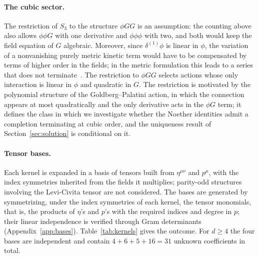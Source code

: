 \documentclass[prd,aps,preprint,nofootinbib,amsmath,amssymb,eqsecnum]{revtex4-2}
\begin{document}
\paragraph{The cubic sector.} The restriction of $S_3$ to the structure $\phi GG$ is an
assumption: the counting above also allows $\phi\phi G$ with one derivative and
$\phi\phi\phi$ with two, and both would keep the field equation of $G$ algebraic. Moreover, since $\delta^{(1)}\phi$ is linear in $\phi$, the variation of a nonvanishing purely
metric kinetic term would have to be compensated by terms of higher order in the fields; in the
metric formulation this leads to a series that does not terminate~\cite{BrandtFrenkel1996}.
The restriction to $\phi GG$ selects actions whose only interaction is linear in $\phi$ and
quadratic in $G$. The
restriction is motivated by the polynomial structure of the Goldberg--Palatini action, in
which the connection appears at most quadratically and the only derivative acts in the
$\phi G$ term; it defines the class in which we investigate whether the Noether identities
admit a completion terminating at cubic order, and the uniqueness result of
Section~\ref{sec:solution} is conditional on it.

\paragraph{Tensor bases.} Each kernel is expanded in a basis of tensors built from
$\eta^{\mu\nu}$ and $p^\mu$, with the index symmetries inherited from the fields it
multiplies; parity-odd structures involving the Levi-Civita tensor are not considered. The
bases are generated by symmetrizing, under the index symmetries of each kernel, the tensor
monomials, that is, the products of $\eta$'s and $p$'s with the required indices and degree
in $p$; their linear independence is verified through Gram determinants
(Appendix~\ref{app:bases}). Table~\ref{tab:kernels} gives the outcome. For $d\geq4$ the
four bases are independent and contain $4+6+5+16=31$ unknown coefficients in total.
\end{document}
